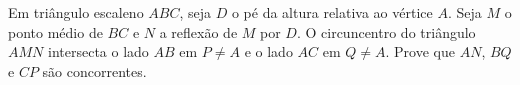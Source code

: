 Em triângulo escaleno $ABC$, seja $D$ o pé da altura relativa ao vértice $A$. Seja $M$ o ponto médio de $BC$ e $N$ a reflexão de $M$ por $D$. O circuncentro do triângulo $AMN$ intersecta o lado $AB$ em $P \ne A$ e o lado $AC$ em $Q \ne A$. Prove que $AN$, $BQ$ e $CP$ são concorrentes.
